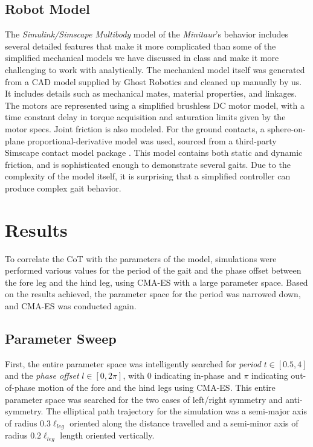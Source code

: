 \documentclass[conference,11pt,letterpaper]{IEEEtran}
\begin{document}
\subsection{Robot Model}
The \emph{Simulink/Simscape Multibody} model of the \emph{Minitaur}'s behavior includes several detailed features that make it more complicated than some of the simplified mechanical models we have discussed in class and make it more challenging to work with analytically. The mechanical model itself was generated from a CAD model supplied by Ghost Robotics and cleaned up manually by us. It includes details such as mechanical mates, material properties, and linkages. The motors are represented using a simplified brushless DC motor model, with a time constant delay in torque acquisition and saturation limits given by the motor specs. Joint friction is also modeled. For the ground contacts, a sphere-on-plane proportional-derivative model was used, sourced from a third-party Simscape contact model package \autocite{contactmodel}. This model contains both static and dynamic friction, and is sophisticated enough to demonstrate several gaits. Due to the complexity of the model itself, it is surprising that a simplified controller can produce complex gait behavior.

\section{Results}

To correlate the CoT with the parameters of the model, simulations were performed various values for the period of the gait and the phase offset between the fore leg and the hind leg, using CMA-ES with a large parameter space. Based on the results achieved, the parameter space for the period was narrowed down, and CMA-ES was conducted again.

\subsection{Parameter Sweep}
First, the entire parameter space was intelligently searched for \emph{period} $t \in[0.5,4]$ and the \emph{phase offset} $l \in[0,2\pi]$, with $0$ indicating in-phase and $\pi$ indicating out-of-phase motion of the fore and the hind legs using CMA-ES. This entire parameter space was searched for the two cases of left/right symmetry and anti-symmetry. The elliptical path trajectory for the simulation was a semi-major axis of radius $0.3\ell_{leg}$ oriented along the distance travelled and a semi-minor axis of radius $0.2\ell_{leg}$ length oriented vertically. 
\end{document}
